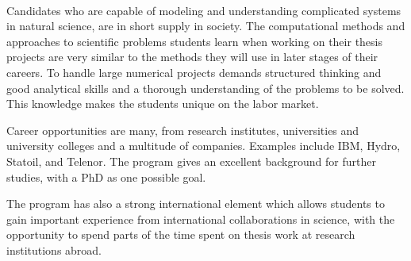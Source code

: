 \documentclass[%
oneside,                 %
final,                   %
10pt]{article}
\begin{document}
\paragraph{}
Candidates who are capable of modeling and understanding complicated
systems in natural science, are in short supply in society.  The
computational methods and approaches to scientific problems students learn
when working on their thesis projects are very similar to the methods
they will use in later stages of their careers.  To handle large
numerical projects demands structured thinking and good analytical
skills and a thorough understanding of the problems to be solved. This
knowledge makes the students unique on the labor market.

Career opportunities are many, from research institutes, universities
and university colleges and a multitude of companies. Examples
include IBM, Hydro, Statoil, and Telenor.  The program gives an
excellent background for further studies, with a PhD as one possible
goal.

The program has also a strong international element which allows students to
gain important experience from international collaborations in
science, with the opportunity to spend parts of the time spent on
thesis work at research institutions abroad.





\end{document}
